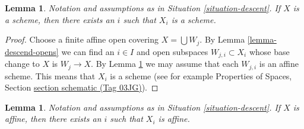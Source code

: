 \documentclass{amsart}
\theoremstyle{plain}
\newtheorem{lemma}[subsection]{Lemma}
\theoremstyle{definition}
\theoremstyle{remark}
\numberwithin{equation}{subsection}
\begin{document}
\begin{lemma}
\label{lemma-limit-is-scheme}
Notation and assumptions as in Situation \ref{situation-descent}.
If $X$ is a scheme, then there exists an $i$ such that $X_i$ is a scheme.
\end{lemma}

\begin{proof}
Choose a finite affine open covering $X = \bigcup W_j$.
By Lemma \ref{lemma-descend-opens}
we can find an $i \in I$ and open subspaces $W_{j, i} \subset X_i$
whose base change to $X$ is $W_j \to X$. By
Lemma \ref{lemma-limit-is-affine} we may assume that
each $W_{j, i}$ is an affine scheme. This means that $X_i$
is a scheme (see for example
Properties of Spaces, Section \href{https://stacks.math.columbia.edu/tag/03JG}{section schematic (Tag 03JG)}).
\end{proof}


\begin{lemma}
\label{lemma-limit-is-affine}
Notation and assumptions as in Situation \ref{situation-descent}.
If $X$ is affine, then there exists an $i$ such that $X_i$ is affine.
\end{lemma}
\end{document}
